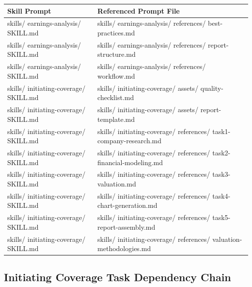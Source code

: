 \documentclass[11pt]{article}
\begin{document}
\begingroup
\small
\setlength{\tabcolsep}{2pt}
\begin{longtable}{>{\RaggedRight\arraybackslash\hspace{0pt}}p{}>{\RaggedRight\arraybackslash\hspace{0pt}}p{}}
\toprule
{} \textbf{Skill Prompt} & \textbf{Referenced Prompt File} \\
\midrule
{} skills/ earnings-analysis/ SKILL.md & skills/ earnings-analysis/ references/ best-practices.md \\
{} skills/ earnings-analysis/ SKILL.md & skills/ earnings-analysis/ references/ report-structure.md \\
{} skills/ earnings-analysis/ SKILL.md & skills/ earnings-analysis/ references/ workflow.md \\
{} skills/ initiating-coverage/ SKILL.md & skills/ initiating-coverage/ assets/ quality-checklist.md \\
{} skills/ initiating-coverage/ SKILL.md & skills/ initiating-coverage/ assets/ report-template.md \\
{} skills/ initiating-coverage/ SKILL.md & skills/ initiating-coverage/ references/ task1-company-research.md \\
{} skills/ initiating-coverage/ SKILL.md & skills/ initiating-coverage/ references/ task2-financial-modeling.md \\
{} skills/ initiating-coverage/ SKILL.md & skills/ initiating-coverage/ references/ task3-valuation.md \\
{} skills/ initiating-coverage/ SKILL.md & skills/ initiating-coverage/ references/ task4-chart-generation.md \\
{} skills/ initiating-coverage/ SKILL.md & skills/ initiating-coverage/ references/ task5-report-assembly.md \\
{} skills/ initiating-coverage/ SKILL.md & skills/ initiating-coverage/ references/ valuation-methodologies.md \\
\bottomrule
\end{longtable}
\endgroup

\subsection{Initiating Coverage Task Dependency Chain}
\end{document}
